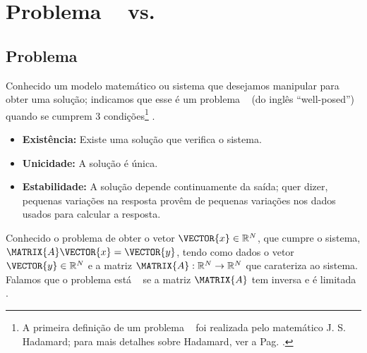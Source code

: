 \section{Problema \wellposed~ vs. \illposed }

\subsection{Problema \wellposed}
\begin{definition}
\label{def:bem-posto:1}
Conhecido um modelo matemático ou sistema que desejamos manipular para obter uma solução;
indicamos que esse é um problema \wellposed~ (do inglês ``well-posed'') 
quando se cumprem 3 condições\footnote{A primeira definição de um problema \wellposed~ 
foi realizada pelo matemático J. S. Hadamard; 
para mais detalhes sobre Hadamard, ver a Pag. \pageref{elab:Hadamard}.} \cite[pp. 16]{gockenbach2016linear}
\cite[pp. 6]{p2011well}.
\begin{itemize}
\item \textbf{Existência:} Existe uma solução que verifica o sistema.
\item \textbf{Unicidade:} A solução é única.
\item \textbf{Estabilidade:} A solução depende continuamente da saída;
quer dizer, pequenas variações na resposta provêm de pequenas variações nos dados usados para calcular a resposta.
\end{itemize}
\end{definition}

\begin{example}
Conhecido o problema de obter o vetor $\VECTOR{x} \in \mathbb{R}^{N}$,
que cumpre o sistema, $\MATRIX{A}\VECTOR{x}=\VECTOR{y}$,
 tendo como dados o vetor $\VECTOR{y} \in \mathbb{R}^{N}$ e 
a matriz $\MATRIX{A}: \mathbb{R}^{N} \rightarrow \mathbb{R}^{N}$ que carateriza ao sistema.
Falamos que o problema está \wellposed~ se a matriz $\MATRIX{A}$ 
tem inversa e é limitada \cite[pp. 18]{gockenbach2016linear}. 
\end{example}

